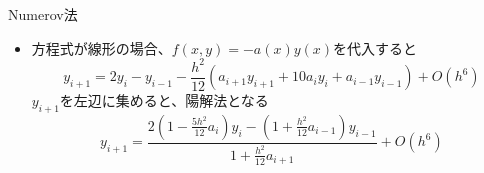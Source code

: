 \begin{frame}[t,fragile]{Numerov法}
  \begin{itemize}
    \setlength{\itemsep}{1em}
  \item 方程式が線形の場合、$f(x,y) = -a(x) y(x)$を代入すると
    \[
    y_{i+1} = 2y_i - y_{i-1} - \frac{h^2}{12} (a_{i+1}y_{i+1} + 10a_{i}y_{i} + a_{i-1}y_{i-1}) + O(h^6)
    \]
  $y_{i+1}$を左辺に集めると、陽解法となる
    \[
    y_{i+1} = \frac{2 (1-\frac{5h^2}{12} a_i)y_i - (1 + \frac{h^2}{12} a_{i-1}) y_{i-1}}{1 + \frac{h^2}{12} a_{i+1}} + O(h^6)
    \]
  \end{itemize}
\end{frame}
